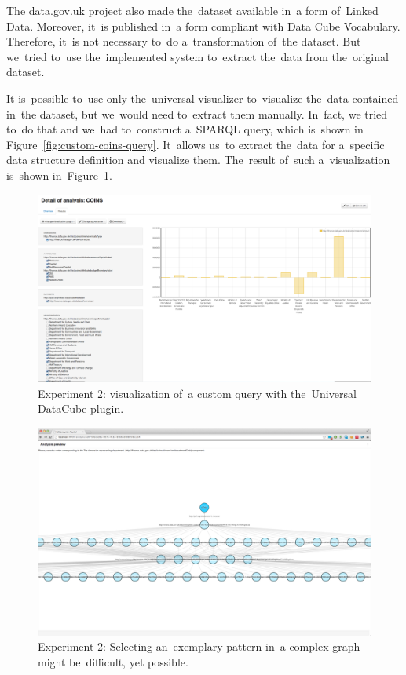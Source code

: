 The \url{data.gov.uk} project also made the~dataset available in~a form of~Linked 
Data. Moreover, it~is published in~a form compliant with Data Cube Vocabulary.
Therefore, it~is not necessary to~do a~transformation of~the dataset. But we~tried to~use the~implemented system to~extract the~data from the~original 
dataset.

It is~possible to~use only the~universal visualizer to~visualize the~data 
contained in~the dataset, but we~would need to~extract them manually. In~fact, 
we tried to~do that and we~had to~construct a~SPARQL query, which is~shown in
Figure~\ref{fig:custom-coins-query}. It~allows us~to extract the~data for a~specific data structure 
definition and visualize them. The~result of~such a~visualization is~shown in~Figure~\ref{fig:payola-exp-02}. 

\begin{figure}
  \centering
  \includegraphics[width=140mm]{img/payola-exp-02.png}
  \caption{Experiment 2: visualization of~a custom query with the~Universal DataCube plugin.}
  \label{fig:payola-exp-02}
\end{figure}

\begin{figure}
  \centering
  \includegraphics[width=140mm]{img/payola-exp-02-pattern.png}
  \caption{Experiment 2: Selecting an~exemplary pattern in~a complex graph might be~difficult, yet possible.}
  \label{fig:payola-exp-02-pattern}
\end{figure}

